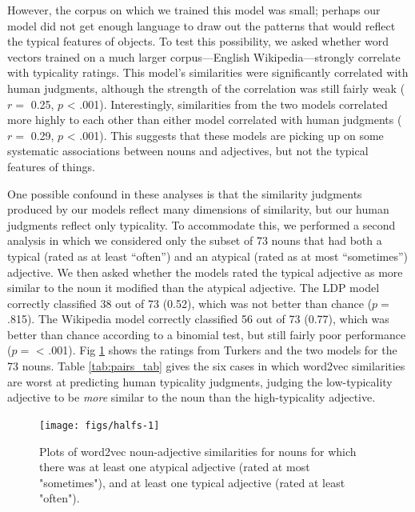 \documentclass[10pt, letterpaper]{article}
\newenvironment{CodeChunk}{}{}
\begin{document}
However, the corpus on which we trained this model was small; perhaps
our model did not get enough language to draw out the patterns that
would reflect the typical features of objects. To test this possibility,
we asked whether word vectors trained on a much larger corpus---English
Wikipedia---strongly correlate with typicality ratings. This model's
similarities were significantly correlated with human judgments,
although the strength of the correlation was still fairly weak (\(r =\)
0.25, \(p\) \textless{} .001). Interestingly, similarities from the two
models correlated more highly to each other than either model correlated
with human judgments (\(r =\) 0.29, \(p\) \textless{} .001). This
suggests that these models are picking up on some systematic
associations between nouns and adjectives, but not the typical features
of things.

One possible confound in these analyses is that the similarity judgments
produced by our models reflect many dimensions of similarity, but our
human judgments reflect only typicality. To accommodate this, we
performed a second analysis in which we considered only the subset of 73
nouns that had both a typical (rated as at least ``often'') and an
atypical (rated as at most ``sometimes'') adjective. We then asked
whether the models rated the typical adjective as more similar to the
noun it modified than the atypical adjective. The LDP model correctly
classified 38 out of 73 (0.52), which was not better than chance
(\(p =\) .815). The Wikipedia model correctly classified 56 out of 73
(0.77), which was better than chance according to a binomial test, but
still fairly poor performance (\(p =\) \textless{} .001). Fig
\ref{fig:halfs} shows the ratings from Turkers and the two models for
the 73 nouns. Table \ref{tab:pairs_tab} gives the six cases in which
word2vec similarities are worst at predicting human typicality
judgments, judging the low-typicality adjective to be \emph{more}
similar to the noun than the high-typicality adjective.

\begin{CodeChunk}
\begin{figure}[tb]

{\centering \texttt{[image: figs/halfs-1]} 

}

\caption[Plots of word2vec noun-adjective similarities for nouns for which there was at least one atypical adjective (rated at most "sometimes"), and at least one typical adjective (rated at least "often")]{Plots of word2vec noun-adjective similarities for nouns for which there was at least one atypical adjective (rated at most "sometimes"), and at least one typical adjective (rated at least "often").}\label{fig:halfs}
\end{figure}
\end{CodeChunk}
\end{document}
